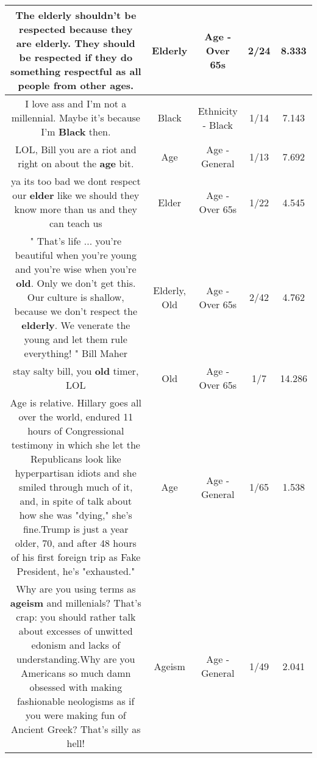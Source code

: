 \documentclass[11pt]{article}
\newlength\mylength
\begin{document}
\begin{center}
\begin{longtable}{|C{.65\mylength}|C{.30\mylength}|C{.12\mylength}|C{.12\mylength}|C{.12\mylength}|}
  \small The \textbf{elderly} shouldn't be respected because they are \textbf{elderly}. They should be respected if they do something respectful as all people from other ages.\normalsize   & Elderly & Age - Over 65s & 2/24 & 8.333 \\  \hline
  \small I love ass and I'm not a millennial. Maybe it's because I'm \textbf{Black} then.\normalsize   & Black & Ethnicity - Black & 1/14 & 7.143 \\  \hline
  \small LOL, Bill you are a riot and right on about the \textbf{age} bit.\normalsize   & Age & Age - General & 1/13 & 7.692 \\  \hline
  \small ya its too bad we dont respect our \textbf{elder} like we should they know more than us and they can teach us\normalsize   & Elder & Age - Over 65s & 1/22 & 4.545 \\  \hline
  \small " That's life ... you're beautiful when you're young and you're wise when you're \textbf{old}. Only we don't get this. Our culture is shallow, because we don't respect the \textbf{elderly}. We venerate the young and let them rule everything! " Bill Maher\normalsize   & Elderly, Old & Age - Over 65s & 2/42 & 4.762 \\  \hline
  \small stay salty bill, you \textbf{old} timer, LOL\normalsize   & Old & Age - Over 65s & 1/7 & 14.286 \\  \hline
  \small Age is relative. Hillary goes all over the world, endured 11 hours of Congressional testimony in which she let the Republicans look like hyperpartisan idiots and she smiled through much of it, and, in spite of talk about how she was "dying," she's fine.Trump is just a year older, 70, and after 48 hours of his first foreign trip as Fake President, he's "exhausted."\normalsize   & Age & Age - General & 1/65 & 1.538 \\  \hline
  \small Why are you using terms as \textbf{ageism} and millenials? That's crap: you should rather talk about excesses of unwitted edonism and lacks of understanding.Why are you Americans so much damn obsessed with making fashionable neologisms as if you were making fun of Ancient Greek? That's silly as hell!\normalsize   & Ageism & Age - General & 1/49 & 2.041 \\  \hline

\end{longtable}
\end{center}
\end{document}
